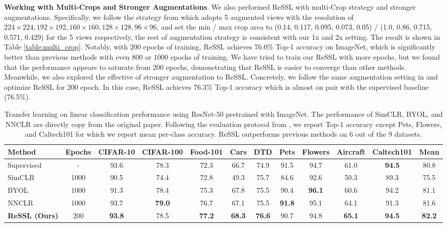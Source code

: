 \documentclass{article}
\newcommand{\<}{\left\langle}
\renewcommand{\>}{\right\rangle}
\begin{document}
\textbf{Working with Multi-Crops and Stronger Augmentations}.
We also performed ReSSL with multi-Crop strategy and stronger augmentations. Specifically, we follow the strategy from \cite{adco} which adopts 5 augmented views with the resolution of $224 \times 224, 192 \times 192, 160 \times 160, 128 \times 128, 96 \times 96 $, and set the min / max crop area to (0.14, 0.117, 0.095, 0.073, 0.05) / (1.0,  0.86,  0.715, 0.571, 0.429) for the 5 views respectively, the rest of augmentation strategy is consistent with our 1x and 2x setting. The result is shown in Table \ref{table:multi_crop}. Notably, with 200 epochs of training, ReSSL achieves 76.0\% Top-1 accuracy on ImageNet, which is significantly better than previous methods with even 800 or 1000 epochs of training. We have tried to train our ReSSL with more epochs, but we found that the performance appears to saturate from 200 epochs, demonstrating that ReSSL is easier to converge than other methods. Meanwhile, we also explored the effective of stronger augmentation to ReSSL. Concretely, we follow the same augmentation setting in \cite{stronger} and optimize ReSSL for 200 epoch. In this case, ReSSL achieves 76.3\% Top-1 accuracy which is almost on pair with the supervised baseline (76.5\%).


\renewcommand\arraystretch{1.0}
\begin{table*}
    \centering
    \caption{Transfer learning on linear classification performance using ResNet-50 pretrained with ImageNet. The performance of SimCLR, BYOL, and NNCLR are directly copy from the original paper. Following the evaluation protocol from \cite{simclr}, we report Top-1 accuracy except Pets, Flowers, and Caltech101 for which we report mean per-class accuracy. ReSSL outperforms previous methods on 6 out of the 9 datasets.}
    \vspace{-10pt}
    \begin{tabular}{l c c c c c c c c c c c}
    \toprule
        Method & Epochs & CIFAR-10 & CIFAR-100 &  Food-101 & Cars & DTD & Pets & Flowers & Aircraft & Caltech101 &  Mean \\ \hline
        Supervised & - & 93.6 & 78.3 & 72.3 & 66.7 & 74.9 & 91.5 & 94.7 & 61.0 & \textbf{94.5} & 80.8 \\
        SimCLR \cite{simclr} & 1000 & 90.5 & 74.4 & 72.8 & 49.3 & 75.7 & 84.6 & 92.6 & 50.3 & 89.3 & 75.5 \\
        BYOL \cite{byol} & 1000 & 91.3 & 78.4 & 75.3 & 67.8 & 75.5 & 90.4 & \textbf{96.1} & 60.6 & 94.2 & 81.1 \\
        NNCLR \cite{nnclr} & 1000 & 93.7 & \textbf{79.0} & 76.7 & 67.1 & 75.5 & \textbf{91.8} & 95.1 & 64.1 & 91.3 & 81.6 \\ 
        \textbf{ReSSL (Ours)} & 200 & \textbf{93.8} & 78.5 & \textbf{77.2} & \textbf{68.3} & \textbf{76.6} & 90.7 & 94.8 & \textbf{65.1} & \textbf{94.5} & \textbf{82.2} \\ 
        \bottomrule
    \end{tabular}
    \label{table:transfer_result}
    \vspace{-10pt}
\end{table*}
\end{document}
